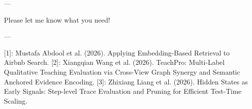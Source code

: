 --- 

Please let me know what you need! 

--- 

[1]: Mustafa Abdool et al. (2026). Applying Embedding-Based Retrieval to Airbnb Search.
[2]: Xiangqian Wang et al. (2026). TeachPro: Multi-Label Qualitative Teaching Evaluation via Cross-View Graph Synergy and Semantic Anchored Evidence Encoding.
[3]: Zhixiang Liang et al. (2026). Hidden States as Early Signals: Step-level Trace Evaluation and Pruning for Efficient Test-Time Scaling.
